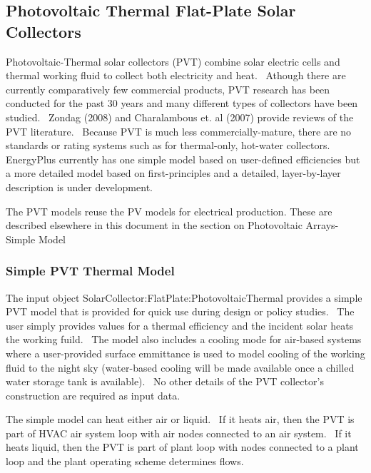 \subsection{Photovoltaic Thermal Flat-Plate Solar Collectors}\label{photovoltaic-thermal-flat-plate-solar-collectors}

Photovoltaic-Thermal solar collectors (PVT) combine solar electric cells and thermal working fluid to collect both electricity and heat.~ Athough there are currently comparatively few commercial products, PVT research has been conducted for the past 30 years and many different types of collectors have been studied.~ Zondag (2008) and Charalambous et. al (2007) provide reviews of the PVT literature.~ Because PVT is much less commercially-mature, there are no standards or rating systems such as for thermal-only, hot-water collectors.~ EnergyPlus currently has one simple model based on user-defined efficiencies but a more detailed model based on first-principles and a detailed, layer-by-layer description is under development.

The PVT models reuse the PV models for electrical production. These are described elsewhere in this document in the section on Photovoltaic Arrays-Simple Model

\subsubsection{Simple PVT Thermal Model}\label{simple-pvt-thermal-model}

The input object SolarCollector:FlatPlate:PhotovoltaicThermal provides a simple PVT model that is provided for quick use during design or policy studies.~ The user simply provides values for a thermal efficiency and the incident solar heats the working fuild.~ The model also includes a cooling mode for air-based systems where a user-provided surface emmittance is used to model cooling of the working fluid to the night sky (water-based cooling will be made available once a chilled water storage tank is available).~ No other details of the PVT collector's construction are required as input data.

The simple model can heat either air or liquid.~ If it heats air, then the PVT is part of HVAC air system loop with air nodes connected to an air system.~ If it heats liquid, then the PVT is part of plant loop with nodes connected to a plant loop and the plant operating scheme determines flows.

